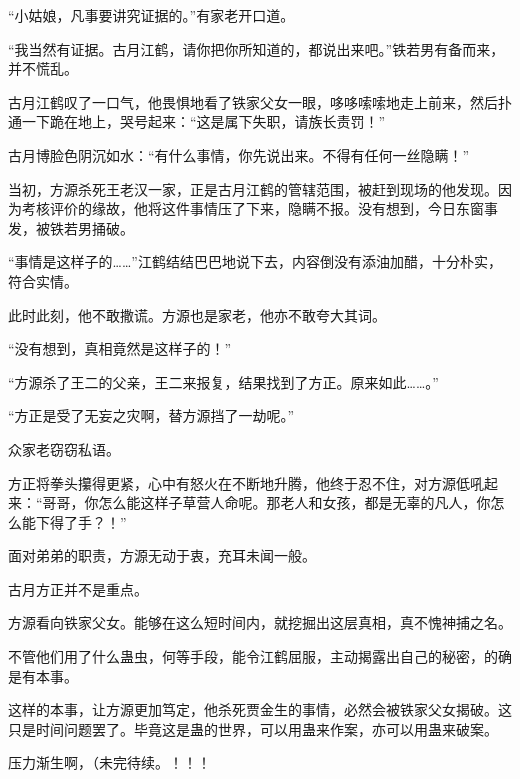 \begin{this_body}
“小姑娘，凡事要讲究证据的。”有家老开口道。

“我当然有证据。古月江鹤，请你把你所知道的，都说出来吧。”铁若男有备而来，并不慌乱。

古月江鹤叹了一口气，他畏惧地看了铁家父女一眼，哆哆嗦嗦地走上前来，然后扑通一下跪在地上，哭号起来：“这是属下失职，请族长责罚！”

古月博脸色阴沉如水：“有什么事情，你先说出来。不得有任何一丝隐瞒！”

当初，方源杀死王老汉一家，正是古月江鹤的管辖范围，被赶到现场的他发现。因为考核评价的缘故，他将这件事情压了下来，隐瞒不报。没有想到，今日东窗事发，被铁若男捅破。

“事情是这样子的……”江鹤结结巴巴地说下去，内容倒没有添油加醋，十分朴实，符合实情。

此时此刻，他不敢撒谎。方源也是家老，他亦不敢夸大其词。

“没有想到，真相竟然是这样子的！”

“方源杀了王二的父亲，王二来报复，结果找到了方正。原来如此……。”

“方正是受了无妄之灾啊，替方源挡了一劫呢。”

众家老窃窃私语。

方正将拳头攥得更紧，心中有怒火在不断地升腾，他终于忍不住，对方源低吼起来：“哥哥，你怎么能这样子草营人命呢。那老人和女孩，都是无辜的凡人，你怎么能下得了手？！”

面对弟弟的职责，方源无动于衷，充耳未闻一般。

古月方正并不是重点。

方源看向铁家父女。能够在这么短时间内，就挖掘出这层真相，真不愧神捕之名。

不管他们用了什么蛊虫，何等手段，能令江鹤屈服，主动揭露出自己的秘密，的确是有本事。

这样的本事，让方源更加笃定，他杀死贾金生的事情，必然会被铁家父女揭破。这只是时间问题罢了。毕竟这是蛊的世界，可以用蛊来作案，亦可以用蛊来破案。

压力渐生啊，（未完待续。！！！

\end{this_body}

